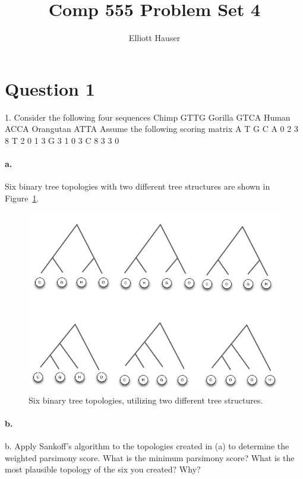 \documentclass[12pt]{article}
\author{Elliott Hauser}
\title{Comp 555 Problem Set 4}
\begin{document}
\maketitle

\section*{Question 1}
1. Consider the following four sequences 
Chimp GTTG
Gorilla  GTCA
Human  ACCA
Orangutan ATTA
Assume the following scoring matrix
  A T G C
A 0 2 3 8
T 2 0 1 3
G 3 1 0 3
C 8 3 3 0

\paragraph{a.} %
\label{par:1a}
Six binary tree topologies with two different tree structures are shown in Figure~\ref{trees}. 

\begin{figure}[htb]
	\begin{center}
		\includegraphics[width=5in]{trees.jpg}
	\end{center}
	\caption{Six binary tree topologies, utilizing two different tree structures.}
	\label{trees}
\end{figure}

\paragraph{b.}
\label{par:1b}
b. Apply Sankoff’s algorithm to the topologies created in (a) to 
determine the weighted parsimony score. What is the minimum parsimony 
score? What is the most plausible topology of the six you created? 
Why?
\end{document}
